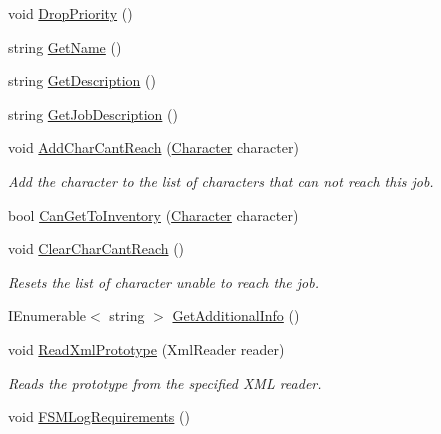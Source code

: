 \begin{DoxyCompactItemize}
\item 
void \hyperlink{class_job_adca382bacf03b82dbdaf6eb8178c97c1}{Drop\+Priority} ()
\item 
string \hyperlink{class_job_a250a84373e09871c23aab690829e91af}{Get\+Name} ()
\item 
string \hyperlink{class_job_a03ba4d976ec78d3e36b6ac7f5124ca06}{Get\+Description} ()
\item 
string \hyperlink{class_job_a7161746f9a93cc8dc204a01ca01cf2fa}{Get\+Job\+Description} ()
\item 
void \hyperlink{class_job_adfb8aca515c080a5dabb6d2bc2a8b615}{Add\+Char\+Cant\+Reach} (\hyperlink{class_project_porcupine_1_1_entities_1_1_character}{Character} character)
\begin{DoxyCompactList}\small\item\em Add the character to the list of characters that can not reach this job. \end{DoxyCompactList}\item 
bool \hyperlink{class_job_a5dda43629c29e13b94b6faeb6380e572}{Can\+Get\+To\+Inventory} (\hyperlink{class_project_porcupine_1_1_entities_1_1_character}{Character} character)
\item 
void \hyperlink{class_job_ae8040a01c1ba22f4e108eb623adce4b5}{Clear\+Char\+Cant\+Reach} ()
\begin{DoxyCompactList}\small\item\em Resets the list of character unable to reach the job. \end{DoxyCompactList}\item 
I\+Enumerable$<$ string $>$ \hyperlink{class_job_a12f5c3ebc9277bc67f110ec80287ae37}{Get\+Additional\+Info} ()
\item 
void \hyperlink{class_job_a4f006710b0158ef22c0b4c5b8ca63e6f}{Read\+Xml\+Prototype} (Xml\+Reader reader)
\begin{DoxyCompactList}\small\item\em Reads the prototype from the specified X\+ML reader. \end{DoxyCompactList}\item 
void \hyperlink{class_job_a4bc970de019bb287e67e3fd9a7098ceb}{F\+S\+M\+Log\+Requirements} ()
\end{DoxyCompactItemize}
